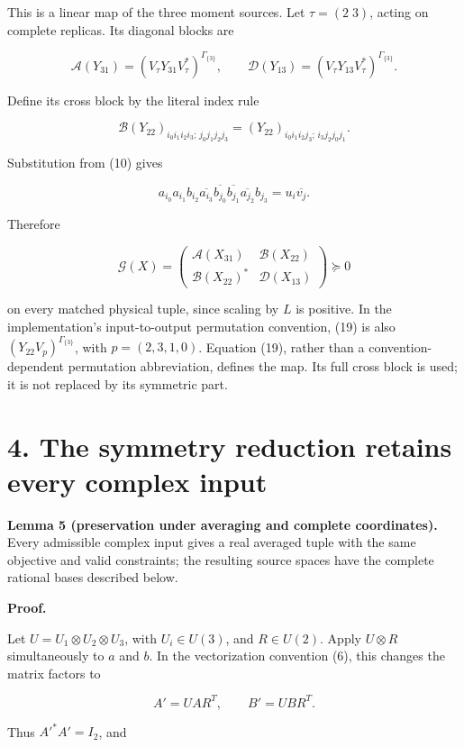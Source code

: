 \documentclass[
  11pt,
]{article}
\begin{document}
This is a linear map of the three moment sources. Let \(\tau=(2\;3)\),
acting on complete replicas. Its diagonal blocks are

\[
\mathcal A(Y_{31})=(V_\tau Y_{31}V_\tau^*)^{\Gamma_{\{3\}}},\qquad
\mathcal D(Y_{13})=(V_\tau Y_{13}V_\tau^*)^{\Gamma_{\{3\}}}.
\tag{18}
\]

Define its cross block by the literal index rule

\[
\mathcal B(Y_{22})_{i_0i_1i_2i_3;\,j_0j_1j_2j_3}
=(Y_{22})_{i_0i_1i_2j_3;\,i_3j_2j_0j_1}.
\tag{19}
\]

Substitution from (10) gives

\[
a_{i_0}a_{i_1}b_{i_2}\overline{a_{i_3}}
\overline{b_{j_0}}\overline{b_{j_1}}\overline{a_{j_2}}b_{j_3}
=u_i\overline{v_j}.
\]

Therefore

\[
\mathcal G(X)=
\begin{pmatrix}\mathcal A(X_{31})&\mathcal B(X_{22})\\
\mathcal B(X_{22})^*&\mathcal D(X_{13})\end{pmatrix}\succeq0
\tag{20}
\]

on every matched physical tuple, since scaling by \(L\) is positive. In
the implementation's input-to-output permutation convention, (19) is
also \((Y_{22}V_p)^{\Gamma_{\{3\}}}\), with \(p=(2,3,1,0)\). Equation
(19), rather than a convention-dependent permutation abbreviation,
defines the map. Its full cross block is used; it is not replaced by its
symmetric part.

\section{4. The symmetry reduction retains every complex
input}\label{the-symmetry-reduction-retains-every-complex-input}

\textbf{Lemma 5 (preservation under averaging and complete
coordinates).} Every admissible complex input gives a real averaged
tuple with the same objective and valid constraints; the resulting
source spaces have the complete rational bases described below.

\textbf{Proof.}

Let \(U=U_1\otimes U_2\otimes U_3\), with \(U_i\in U(3)\), and
\(R\in U(2)\). Apply \(U\otimes R\) simultaneously to \(a\) and \(b\).
In the vectorization convention (6), this changes the matrix factors to

\[
A'=UAR^T,\qquad B'=UBR^T.
\]

Thus \(A'^*A'=I_2\), and
\end{document}
